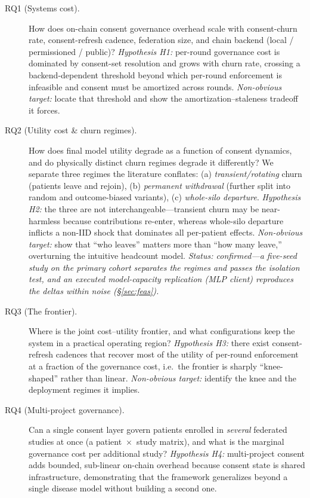 \documentclass[11pt]{article}
\begin{document}
\begin{description}
\item[RQ1 (Systems cost).] How does on-chain consent governance overhead scale
with consent-churn rate, consent-refresh cadence, federation size, and chain
backend (local / permissioned / public)? \emph{Hypothesis H1:} per-round
governance cost is dominated by consent-set resolution and grows with churn rate,
crossing a backend-dependent threshold beyond which per-round enforcement is
infeasible and consent must be amortized across rounds. \emph{Non-obvious target:}
locate that threshold and show the amortization--staleness tradeoff it forces.

\item[RQ2 (Utility cost \& churn regimes).] How does final model utility degrade
as a function of consent dynamics, and do physically distinct churn regimes
degrade it differently? We separate three regimes the literature conflates: (a)
\emph{transient/rotating} churn (patients leave and rejoin), (b) \emph{permanent
withdrawal} (further split into random and outcome-biased variants), (c)
\emph{whole-silo departure}. \emph{Hypothesis H2:} the three are
not interchangeable---transient churn may be near-harmless because contributions
re-enter, whereas whole-silo departure inflicts a non-IID shock that dominates
all per-patient effects. \emph{Non-obvious target:} show that ``who leaves''
matters more than ``how many leave,'' overturning the intuitive headcount model.
\emph{Status: confirmed---a five-seed study on the primary cohort separates the
regimes and passes the isolation test, and an executed model-capacity
replication (MLP client) reproduces the deltas within noise
(\S\ref{sec:feas}).}

\item[RQ3 (The frontier).] Where is the joint cost--utility frontier, and what
configurations keep the system in a practical operating region? \emph{Hypothesis
H3:} there exist consent-refresh cadences that recover most of the utility of
per-round enforcement at a fraction of the governance cost, i.e.\ the frontier is
sharply ``knee-shaped'' rather than linear. \emph{Non-obvious target:} identify
the knee and the deployment regimes it implies.

\item[RQ4 (Multi-project governance).] Can a single consent layer govern patients
enrolled in \emph{several} federated studies at once (a patient~$\times$~study
matrix), and what is the marginal governance cost per additional study?
\emph{Hypothesis H4:} multi-project consent adds bounded, sub-linear on-chain
overhead because consent state is shared infrastructure, demonstrating that the
framework generalizes beyond a single disease model without building a second
one.
\end{description}
\end{document}
